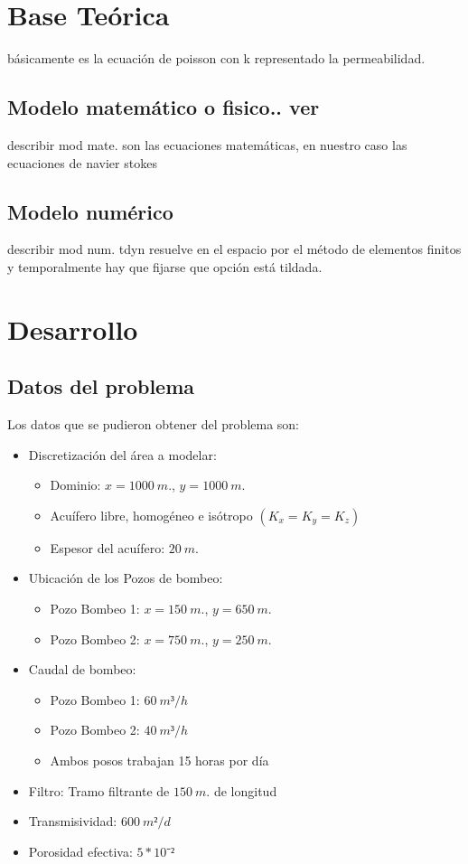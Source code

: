 \documentclass[10pt,a4paper,final]{article}
\begin{document}
\section{Base Teórica}
básicamente es la ecuación de poisson con k
representado la permeabilidad.
\subsection{Modelo matemático o fisico.. ver}
describir mod mate.
 son las ecuaciones matemáticas, en nuestro caso las
ecuaciones de navier stokes
%
\subsection{Modelo numérico}
describir mod num.
tdyn resuelve en el espacio por el método de
elementos finitos y temporalmente hay que fijarse que opción está
tildada.
\section{Desarrollo}
\subsection{Datos del problema}
Los datos que se pudieron obtener del problema son:
\begin{itemize}
	\item Discretización del área a modelar:	
	\begin{itemize}
		\item Dominio: $x=1000 ~m.$, $y=1000 ~m.$
		\item Acuífero libre, homogéneo e isótropo $(K_x = K_y = K_z)$
		\item Espesor del acuífero: $20 ~m.$
	\end{itemize}
	\item Ubicación de los Pozos de bombeo:
	\begin{itemize}
		\item Pozo Bombeo 1: $x=150~m.$, $y=650 ~m.$
		\item Pozo Bombeo 2: $x=750~m.$, $y=250 ~m.$
	\end{itemize}
	\item Caudal de bombeo:
	\begin{itemize}
		\item Pozo Bombeo 1: $60~m³/h$
		\item Pozo Bombeo 2: $40~m³/h$
		\item[] Ambos posos trabajan 15 horas por día
	\end{itemize}
	\item Filtro: Tramo filtrante de $150~m.$ de longitud
	\item Transmisividad: $600~m²/d$
	\item Porosidad efectiva: $5*10⁻²$
\end{itemize}
%
\end{document}
